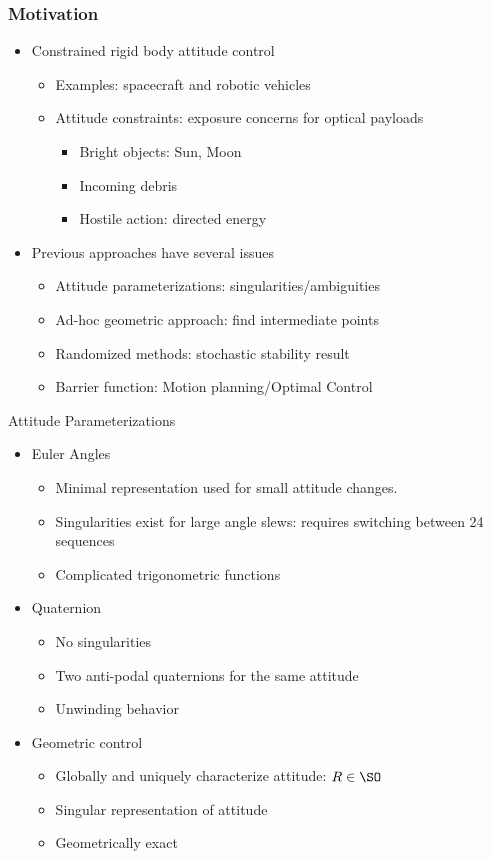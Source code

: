 \documentclass[11pt,professionalfonts]{beamer}
\begin{document}
\begin{frame} %
	\frametitle{Motivation}
	\begin{itemize}
		\item Constrained rigid body attitude control
		\begin{itemize}
			\item Examples: spacecraft and robotic vehicles
			\item Attitude constraints: exposure concerns for optical payloads
			\begin{itemize}
				\item Bright objects: Sun, Moon
				\item Incoming debris
				\item Hostile action: directed energy
			\end{itemize}
		\end{itemize}
	\pause
	\item Previous approaches have several issues
	\begin{itemize}
		\item Attitude parameterizations: singularities/ambiguities
		\item Ad-hoc geometric approach: find intermediate points
		\item Randomized methods: stochastic stability result
		\item Barrier function: Motion planning/Optimal Control
	\end{itemize}
\end{itemize}
\end{frame} %

\begin{frame}{Attitude Parameterizations}
	\begin{itemize}
		\item Euler Angles
		\begin{itemize}
			\item Minimal representation used for small attitude changes.
			\item Singularities exist for large angle slews: requires switching between 24 sequences
			\item Complicated trigonometric functions
		\end{itemize}
		\pause
		\item Quaternion 
		\begin{itemize}
			\item No singularities
			\item Two anti-podal quaternions for the same attitude
			\item Unwinding behavior 
		\end{itemize}
		\pause
		\item Geometric control
		\begin{itemize}
			\item Globally and uniquely characterize attitude: \( R \in \SO \)
			\item Singular representation of attitude 
			\item Geometrically exact
		\end{itemize}
	\end{itemize}
	
\end{frame}
\end{document}
